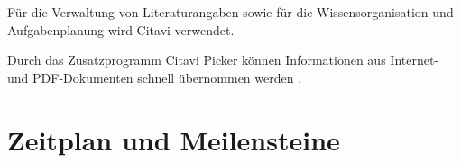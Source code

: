 \documentclass[12pt,a4paper]{article}
\begin{document}
Für die Verwaltung von Literaturangaben sowie für die Wissensorganisation und Aufgabenplanung wird Citavi verwendet. 

Durch das Zusatzprogramm Citavi Picker können Informationen aus Internet- und PDF-Dokumenten schnell übernommen werden \cite{.26.10.2021}.






\section{Zeitplan und Meilensteine}


\end{document}
